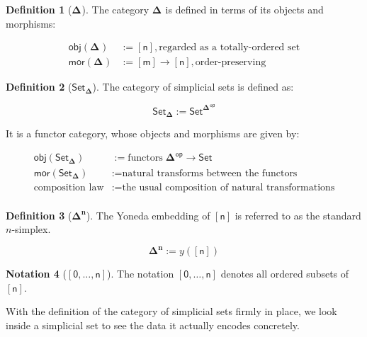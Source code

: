\documentclass[10pt]{amsart}
\newcommand{\obj}{\ensuremath{\mathsf{obj}}}
\newcommand{\mor}{\ensuremath{\mathsf{mor}}}
\newcommand{\Set}{\ensuremath{\mathsf{Set}}}
\newcommand{\op}{\ensuremath{\mathsf{op}}}
\newcommand{\Simplex}[1]{\ensuremath{\boldsymbol{\Delta^{#1}}}}
\newcommand{\SSet}{\ensuremath{\mathsf{Set}_{\boldsymbol{\Delta}}}}
\newcommand{\sq}[1]{\ensuremath{\mathsf{[#1]}}}
\theoremstyle{definition}
\newtheorem{definition}{Definition}[section]
\newtheorem{notation}[definition]{Notation}
\numberwithin{definition}{subsection}
\numberwithin{definition}{section}
\begin{document}
\begin{definition}[\Simplex{}]
  The category $\Simplex{}$ is defined in terms of its objects and morphisms:

  \begin{align*}
    \obj(\Simplex{}) & := \sq{n}, \text{regarded as a totally-ordered set}   \\
    \mor(\Simplex{}) & := \sq{m} \rightarrow \sq{n}, \text{order-preserving}
  \end{align*}
\end{definition}

\begin{definition}[\SSet]
  The category of simplicial sets is defined as:

  \begin{equation*}
    \SSet := \Set^{\Simplex{}^\op}
  \end{equation*}

  It is a functor category, whose objects and morphisms are given by:

  \begin{align*}
    \obj(\SSet)            & := \text{functors} \; \Simplex{}^\op \rightarrow \Set      \\
    \mor(\SSet)            & := \text{natural transforms between the functors}          \\
    \text{composition law} & := \text{the usual composition of natural transformations} \\
  \end{align*}
\end{definition}

\begin{definition}[\Simplex{n}]
  The Yoneda embedding of $\sq{n}$ is referred to as the standard $n$-simplex.

  \begin{equation*}
    \Simplex{n} := y(\sq{n})
  \end{equation*}
\end{definition}

\begin{notation}[$\sq{0, \ldots, n}$]
  The notation $\sq{0, \ldots, n}$ denotes all ordered subsets of \sq{n}.
\end{notation}

With the definition of the category of simplicial sets firmly in place, we look inside a simplicial set to see the data it actually encodes concretely.
\end{document}
